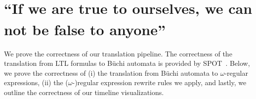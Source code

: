 \documentclass[conference]{IEEEtran}
\theoremstyle{definition}
\theoremstyle{remark}
\newcommand{\Buchi}{B\"{u}chi }
\begin{document}
\section{``If we are true to ourselves, we can not be false to anyone\textsuperscript{\textsection}''}
\label{sec:analysis}
\begingroup\renewcommand\thefootnote{\textsection}
\endgroup

We prove the correctness of our translation pipeline. The correctness of the translation from LTL formulas to \Buchi automata is provided by SPOT~\cite{Dur22}. Below, we prove the correctness of (i) the translation from \Buchi automata to $\omega$-regular expressions, (ii) the ($\omega$-)regular expression rewrite rules we apply, and lastly, we outline the correctness of our timeline visualizations.
\end{document}
